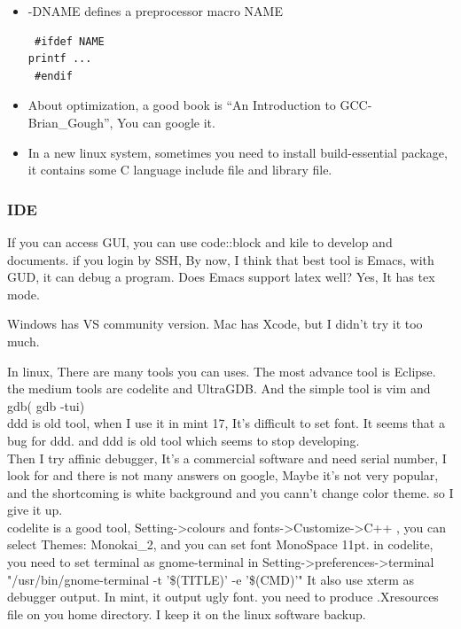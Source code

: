 \documentclass[a4paper,12pt,twoside]{book}
\begin{document}
\begin{itemize}
    \item -DNAME defines a preprocessor macro NAME
\begin{verbatim}
 #ifdef NAME
printf ...
 #endif
\end{verbatim}

   \item About optimization, a good book is ``An Introduction to GCC-Brian\_Gough'', You can google it.

   \item In a new linux system, sometimes you need to install build-essential package,  it contains some C
       language include file and library file.

\end{itemize}



\subsubsection{IDE}
If you can access GUI, you can use code::block and kile to develop and documents. if
you login by SSH, By now, I think that best tool is Emacs, with GUD, it can debug a
program. Does Emacs support latex well? Yes, It has tex mode. \par

Windows has VS community version.  Mac has Xcode, but I didn't try it too much. 

In linux, There are many tools you can uses. The most advance tool is Eclipse. the medium tools are codelite and UltraGDB. And the simple tool is vim and gdb( gdb -tui) \\

ddd is old tool, when I use it in mint 17, It's difficult to set font.  It seems that a bug for ddd. and ddd is old tool which seems to stop developing.  \\

Then I try affinic debugger, It's a commercial software and need serial number, I look for and there is not many answers on google, Maybe it's not very popular,  and the shortcoming is white background and you cann't change color theme. so I give it up. \\

codelite is a good tool, Setting->colours and fonts->Customize->C++ , you can select Themes: Monokai\_2, and you can set font MonoSpace 11pt.  
in codelite, you need to set terminal as gnome-terminal in Setting->preferences->terminal "/usr/bin/gnome-terminal -t '\$(TITLE)' -e '\$(CMD)'"
It also use xterm as debugger output. In mint, it output ugly font.  you need to produce .Xresources file on you home directory.  I keep it on the linux software backup. 
\end{document}
